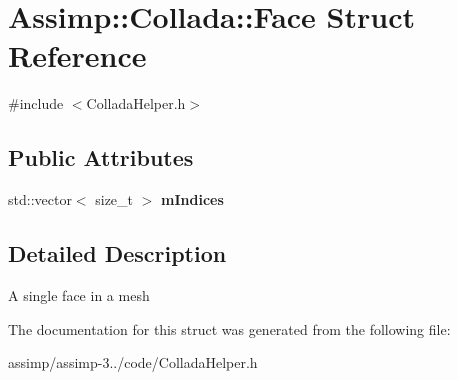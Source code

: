 \hypertarget{struct_assimp_1_1_collada_1_1_face}{\section{Assimp\+:\+:Collada\+:\+:Face Struct Reference}
\label{struct_assimp_1_1_collada_1_1_face}
}


{\ttfamily \#include $<$Collada\+Helper.\+h$>$}

\subsection*{Public Attributes}
\begin{DoxyCompactItemize}
\item 
\hypertarget{struct_assimp_1_1_collada_1_1_face_a44527bd7b54559c86fcb49529c03dda7}{std\+::vector$<$ size\+\_\+t $>$ {\bfseries m\+Indices}}\label{struct_assimp_1_1_collada_1_1_face_a44527bd7b54559c86fcb49529c03dda7}

\end{DoxyCompactItemize}


\subsection{Detailed Description}
A single face in a mesh 

The documentation for this struct was generated from the following file\+:\begin{DoxyCompactItemize}
\item 
assimp/assimp-\/3../code/Collada\+Helper.\+h\end{DoxyCompactItemize}
